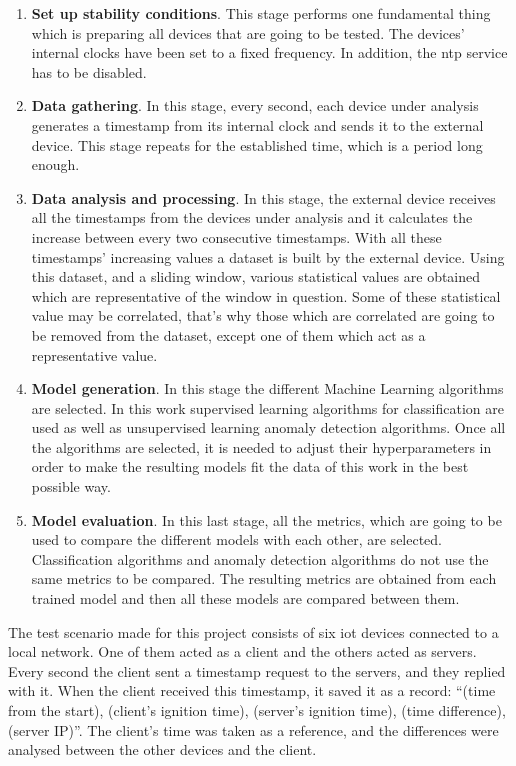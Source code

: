\begin{enumerate}[label=\Alph*)]
    \item \textbf{Set up stability conditions}. This stage performs one fundamental thing which is preparing all devices that are going to be tested. The devices' internal clocks have been set to a fixed frequency. In addition, the \acrshort{ntp} service has to be disabled. 
    \item \textbf{Data gathering}. In this stage, every second, each device under analysis generates a timestamp from its internal clock and sends it to the external device. This stage repeats for the established time, which is a period long enough. 
    \item \textbf{Data analysis and processing}. In this stage, the external device receives all the timestamps from the devices under analysis and it calculates the increase between every two consecutive timestamps. With all these timestamps' increasing values a dataset is built by the external device. Using this dataset, and a sliding window, various statistical values are obtained which are representative of the window in question. Some of these statistical value may be correlated, that's why those which are correlated are going to be removed from the dataset, except one of them which act as a representative value.
    \item \textbf{Model generation}. In this stage the different Machine Learning algorithms are selected. In this work supervised learning algorithms for classification are used as well as unsupervised learning anomaly detection algorithms. Once all the algorithms are selected, it is needed to adjust their hyperparameters in order to make the resulting models fit the data of this work in the best possible way.
    \item \textbf{Model evaluation}. In this last stage, all the metrics, which are going to be used to compare the different models with each other, are selected. Classification algorithms and anomaly detection algorithms do not use the same metrics to be compared. The resulting metrics are obtained from each trained model and then all these models are compared between them.
\end{enumerate}


The test scenario made for this project consists of six \acrshort{iot} devices connected to a local network. One of them acted as a client and the others acted as servers. Every second the client sent a timestamp request to the servers, and they replied with it. When the client received this timestamp, it saved it as a record: ``(time from the start), (client's ignition time), (server's ignition time), (time difference), (server IP)''. The client's time was taken as a reference, and the differences were analysed between the other devices and the client.



